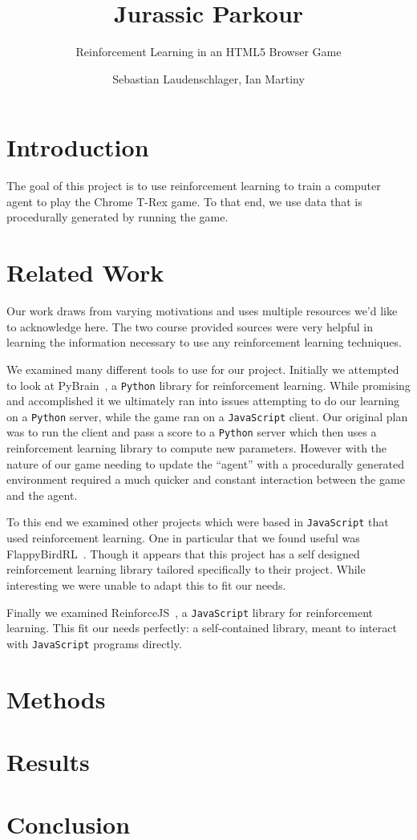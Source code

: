 \documentclass{scrartcl}
\title{Jurassic Parkour}
\subtitle{Reinforcement Learning in an HTML5 Browser Game}
\author{Sebastian Laudenschlager, Ian Martiny}
\begin{document}
\maketitle

\section{Introduction}

The goal of this project is to use reinforcement learning to train a computer agent to play the Chrome T-Rex game. To that end, we use data that is procedurally generated by running the game.

\section{Related Work}
Our work draws from varying motivations and uses multiple resources we'd like to
acknowledge here. The two course provided sources \cite{rltutorial, rlblog} were
very helpful in learning the information necessary to use any reinforcement
learning techniques.

We examined many different tools to use for our project. Initially we attempted
to look at PyBrain~\cite{pybrain}, a \texttt{Python} library for reinforcement
learning. While promising and accomplished it we ultimately ran into issues
attempting to do our learning on a \texttt{Python} server, while the game ran on
a \texttt{JavaScript} client. Our original plan was to run the client and pass
a score to a \texttt{Python} server which then uses a reinforcement learning
library to compute new parameters. However with the nature of our game needing
to update the ``agent'' with a procedurally generated environment required a
much quicker and constant interaction between the game and the agent.

To this end we examined other projects which were based in \texttt{JavaScript}
that used reinforcement learning. One in particular that we found useful was
FlappyBirdRL~\cite{flappybirdrl}. Though it appears that this project has a self
designed reinforcement learning library tailored specifically to their project.
While interesting we were unable to adapt this to fit our needs.

Finally we examined ReinforceJS~\cite{reinforcejs}, a \texttt{JavaScript}
library for reinforcement learning. This fit our needs perfectly: a
self-contained library, meant to interact with \texttt{JavaScript} programs
directly.
\nocite{rlblogex}

\section{Methods}

\section{Results}

\section{Conclusion}





\end{document}
